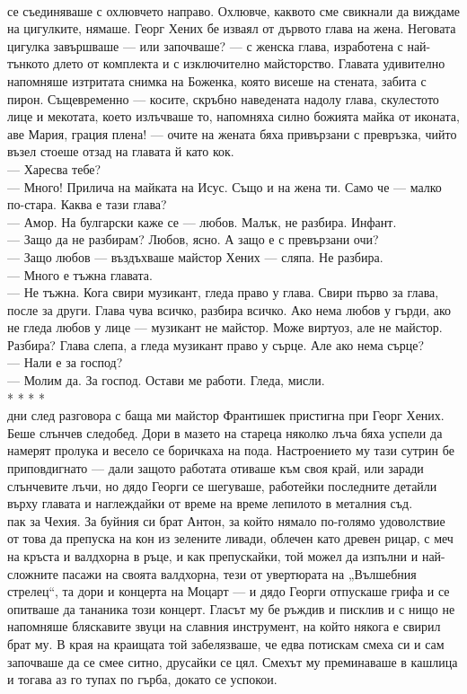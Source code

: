 \documentclass[12pt,a4paper]{article}
\begin{document}
\\
 се съединяваше с охлювчето направо. Охлювче, каквото сме свикнали да виждаме на цигулките, нямаше. Георг Хених бе изваял от дървото глава на жена. Неговата цигулка завършваше — или започваше? — с женска глава, изработена с най-тънкото длето от комплекта и с изключително майсторство. Главата удивително напомняше изтритата снимка на Боженка, която висеше на стената, забита с пирон. Същевременно — косите, скръбно наведената надолу глава, скулестото лице и мекотата, което излъчваше то, напомняха силно божията майка от иконата, аве Мария, грация плена! — очите на жената бяха привързани с превръзка, чийто възел стоеше отзад на главата й като кок.
\\
— Харесва тебе?
\\
— Много! Прилича на майката на Исус. Също и на жена ти. Само че — малко по-стара. Каква е тази глава?
\\
— Амор. На булгарски каже се — любов. Малък, не разбира. Инфант.
\\
— Защо да не разбирам? Любов, ясно. А защо е с превързани очи?
\\
— Защо любов — въздъхваше майстор Хених — сляпа. Не разбира.
\\
— Много е тъжна главата.
\\
— Не тъжна. Кога свири музикант, гледа право у глава. Свири първо за глава, после за други. Глава чува всичко, разбира всичко. Ако нема любов у гърди, ако не гледа любов у лице — музикант не майстор. Може виртуоз, але не майстор. Разбира? Глава слепа, а гледа музикант право у сърце. Але ако нема сърце?
\\
— Нали е за господ?
\\
— Молим да. За господ. Остави ме работи. Гледа, мисли.
\\
* * * *
\\
 дни след разговора с баща ми майстор Франтишек пристигна при Георг Хених. Беше слънчев следобед. Дори в мазето на стареца няколко лъча бяха успели да намерят пролука и весело се боричкаха на пода. Настроението му тази сутрин бе приповдигнато — дали защото работата отиваше към своя край, или заради слънчевите лъчи, но дядо Георги се шегуваше, работейки последните детайли върху главата и наглеждайки от време на време лепилото в металния съд.
\\
 пак за Чехия. За буйния си брат Антон, за който нямало по-голямо удоволствие от това да препуска на кон из зелените ливади, облечен като древен рицар, с меч на кръста и валдхорна в ръце, и как препускайки, той можел да изпълни и най-сложните пасажи на своята валдхорна, тези от увертюрата на „Вълшебния стрелец“, та дори и концерта на Моцарт — и дядо Георги отпускаше грифа и се опитваше да тананика този концерт. Гласът му бе ръждив и писклив и с нищо не напомняше бляскавите звуци на славния инструмент, на който някога е свирил брат му. В края на краищата той забелязваше, че едва потискам смеха си и сам започваше да се смее ситно, друсайки се цял. Смехът му преминаваше в кашлица и тогава аз го тупах по гърба, докато се успокои.
\end{document}
